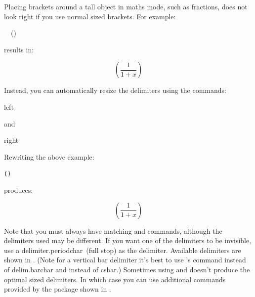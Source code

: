 Placing brackets around a tall object in maths mode, such as
fractions, does not look right if you use normal sized brackets.
For example:
\begin{code}
\newline
\strut~~()\newline
{}
\end{code}%
results in:
\begin{resultS}
\[
(\frac{1}{1+x})
\]
\end{resultS}\bookpagebreak\noindent
Instead, you can automatically resize the delimiters using the
commands:
\begin{definition}
\gls{left}
\end{definition}%
and
\begin{definition}
\gls{right}
\end{definition}%
Rewriting the above example:
\begin{code}
\begin{alltt}
  (  )
\end{alltt}
\end{code}%
produces:
\begin{resultS}
\[
  \left( \frac{1}{1+x} \right)
\]
\end{resultS}%

Note that you must always have matching  and
 commands, although the delimiters used may be
different. \label{obj:invisdelim}If you want
one of the delimiters to be invisible, use a
\gls{delimiter.periodchar}\ (full stop) as the delimiter. Available
delimiters are shown in
. (Note for a vertical bar
delimiter it's best to use 's  command instead of
\gls{delim.barchar} and  instead of \gls{csbar}.) Sometimes using  and
 doesn't produce the optimal sized delimiters. In which
case you can use additional commands provided by the 
package shown in .

